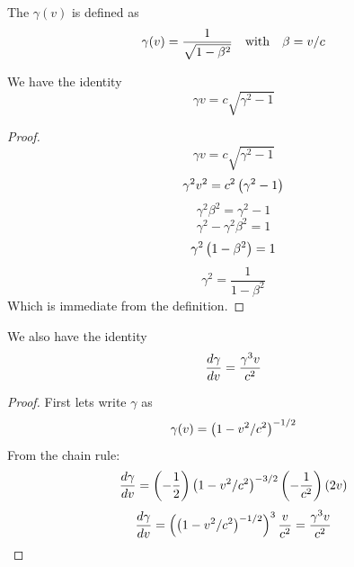 \documentclass[oneside, 10pt, notitlepage]{book}
\begin{document}
The \(\gamma(v)\) is defined as 
\begin{equation}
    \gamma(v) = \frac{1}{\sqrt{1-\beta^2}} \qq{with} \beta = v/c
\end{equation}
  

We have the identity
\begin{equation}\gamma v = c \sqrt{\gamma^2 - 1}\end{equation}
\begin{proof}
	\begin{equation}\gamma v = c \sqrt{\gamma^2 - 1}\end{equation}
	\begin{equation}\gamma^2 v^2 = c^2 \left(\gamma^2 - 1\right)\end{equation}
	\begin{equation}\gamma^2 \beta^2 = \gamma^2 - 1\end{equation}
	\begin{equation}\gamma^2 -\gamma^2 \beta^2 = 1\end{equation}
	\begin{equation}\gamma^2 \left(1 - \beta^2\right) = 1\end{equation}
	\begin{equation}\gamma^2 = \frac{1}{1-\beta^2}\end{equation}
	Which is immediate from the definition.
\end{proof}

We also have the identity 
\begin{equation}\dv{\gamma}{v} = \frac{\gamma^3 v}{c^2}\end{equation}
\begin{proof}
	First lets write \(\gamma\) as 
	\begin{equation}\gamma(v) = \left(1-v^2/c^2\right)^{-1/2}\end{equation}
	From the chain rule: 
	\begin{equation}\dv{\gamma}{v} = \left(-\frac{1}{2}\right)\left(1-v^2/c^2\right)^{-3/2}\left(-\frac{1}{c^2}\right)\left(2v\right)\end{equation}
	\begin{equation}\dv{\gamma}{v} = \left(\left(1-v^2/c^2\right)^{-1/2}\right)^3 \frac{v}{c^2} = \frac{\gamma^3 v}{c^2}\end{equation}
\end{proof}
\end{document}
